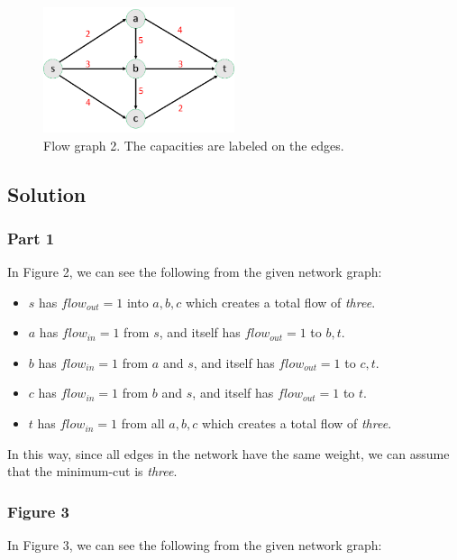 \documentclass[12pt,letterpaper]{article}
\begin{document}
\begin{figure}[h!]
    \centering
    \includegraphics[width=0.5\textwidth]{flow2.png}
    \caption{Flow graph 2. The capacities are labeled on the edges.}
    \label{flow2}
\end{figure}

\newpage
\subsection*{Solution}

\subsubsection*{Part 1}

In Figure 2, we can see the following from the given network graph:

\begin{itemize}
    \item $s$ has $flow_{out} = 1$ into $a, b, c$ which creates a total flow of \textit{three}.
    \item $a$ has $flow_{in} = 1$ from $s$, and itself has $flow_{out} = 1$ to $b, t$.
    \item $b$ has $flow_{in} = 1$ from $a$ and $s$, and itself has $flow_{out} = 1$ to $c, t$.
    \item $c$ has $flow_{in} = 1$ from $b$ and $s$, and itself has $flow_{out} = 1$ to $t$.
    \item $t$ has $flow_{in} = 1$ from all $a, b, c$ which creates a total flow of \textit{three}.
\end{itemize}

In this way, since all edges in the network have the same weight, we can assume that the minimum-cut is \textit{three}.

\subsubsection*{Figure 3}

In Figure 3, we can see the following from the given network graph:
\end{document}
